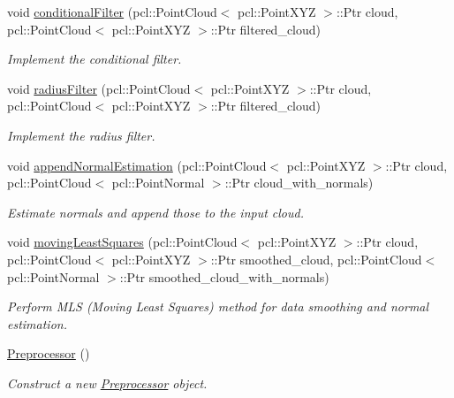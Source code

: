 \begin{DoxyCompactItemize}
void \hyperlink{classhull__abstraction_1_1_preprocessor_a95229af873f6f1a74c832340f8f9b7bf}{conditional\+Filter} (pcl\+::\+Point\+Cloud$<$ pcl\+::\+Point\+X\+YZ $>$\+::Ptr cloud, pcl\+::\+Point\+Cloud$<$ pcl\+::\+Point\+X\+YZ $>$\+::Ptr filtered\+\_\+cloud)
\begin{DoxyCompactList}\small\item\em Implement the conditional filter. \end{DoxyCompactList}\item 
void \hyperlink{classhull__abstraction_1_1_preprocessor_aef6ccdc23a770af04eb6fc1d34aceff9}{radius\+Filter} (pcl\+::\+Point\+Cloud$<$ pcl\+::\+Point\+X\+YZ $>$\+::Ptr cloud, pcl\+::\+Point\+Cloud$<$ pcl\+::\+Point\+X\+YZ $>$\+::Ptr filtered\+\_\+cloud)
\begin{DoxyCompactList}\small\item\em Implement the radius filter. \end{DoxyCompactList}\item 
void \hyperlink{classhull__abstraction_1_1_preprocessor_a9768f4de4320607118636323343b5b5c}{append\+Normal\+Estimation} (pcl\+::\+Point\+Cloud$<$ pcl\+::\+Point\+X\+YZ $>$\+::Ptr cloud, pcl\+::\+Point\+Cloud$<$ pcl\+::\+Point\+Normal $>$\+::Ptr cloud\+\_\+with\+\_\+normals)
\begin{DoxyCompactList}\small\item\em Estimate normals and append those to the input cloud. \end{DoxyCompactList}\item 
void \hyperlink{classhull__abstraction_1_1_preprocessor_adb771d9dfac554a7dd35db7d9acc3ca3}{moving\+Least\+Squares} (pcl\+::\+Point\+Cloud$<$ pcl\+::\+Point\+X\+YZ $>$\+::Ptr cloud, pcl\+::\+Point\+Cloud$<$ pcl\+::\+Point\+X\+YZ $>$\+::Ptr smoothed\+\_\+cloud, pcl\+::\+Point\+Cloud$<$ pcl\+::\+Point\+Normal $>$\+::Ptr smoothed\+\_\+cloud\+\_\+with\+\_\+normals)
\begin{DoxyCompactList}\small\item\em Perform M\+LS (Moving Least Squares) method for data smoothing and normal estimation. \end{DoxyCompactList}\item 
\hyperlink{classhull__abstraction_1_1_preprocessor_aa1e7b3418d273ceddd2faa0777f3598c}{Preprocessor} ()
\begin{DoxyCompactList}\small\item\em Construct a new \hyperlink{classhull__abstraction_1_1_preprocessor}{Preprocessor} object. \end{DoxyCompactList}\item 

\end{DoxyCompactItemize}
